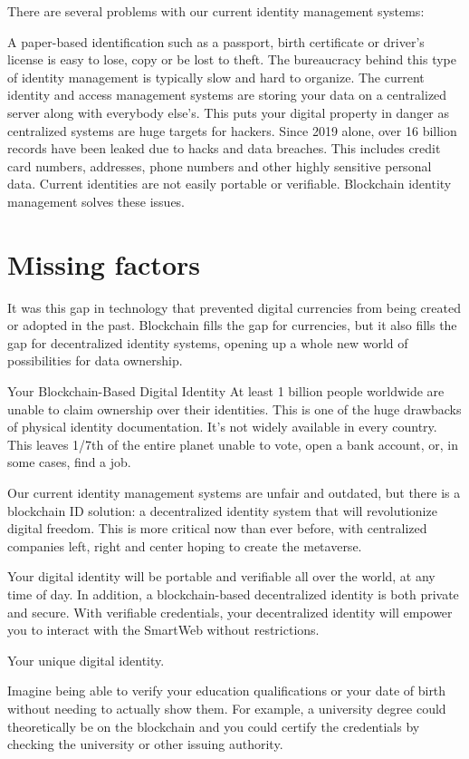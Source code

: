 There are several problems with our current identity management systems:

A paper-based identification such as a passport, birth certificate or driver's license is easy to lose, copy or be lost to theft.
The bureaucracy behind this type of identity management is typically slow and hard to organize.
The current identity and access management systems are storing your data on a centralized server along with everybody else's. This puts your digital property in danger as centralized systems are huge targets for hackers.
Since 2019 alone, over 16 billion records have been leaked due to hacks and data breaches. This includes credit card numbers, addresses, phone numbers and other highly sensitive personal data.
Current identities are not easily portable or verifiable.
Blockchain identity management solves these issues. 


\section{Missing factors}
It was this gap in technology that prevented digital currencies from being created or adopted in the past. Blockchain fills the gap for currencies, but it also fills the gap for decentralized identity systems, opening up a whole new world of possibilities for data ownership.

Your Blockchain-Based Digital Identity
At least 1 billion people worldwide are unable to claim ownership over their identities. This is one of the huge drawbacks of physical identity documentation. It's not widely available in every country. This leaves 1/7th of the entire planet unable to vote, open a bank account, or, in some cases, find a job. 

Our current identity management systems are unfair and outdated, but there is a blockchain ID solution: a decentralized identity system that will revolutionize digital freedom. This is more critical now than ever before, with centralized companies left, right and center hoping to create the metaverse.

Your digital identity will be portable and verifiable all over the world, at any time of day. In addition, a blockchain-based decentralized identity is both private and secure. With verifiable credentials, your decentralized identity will empower you to interact with the SmartWeb without restrictions.

Your unique digital identity.

Imagine being able to verify your education qualifications or your date of birth without needing to actually show them. For example, a university degree could theoretically be on the blockchain and you could certify the credentials by checking the university or other issuing authority. 

